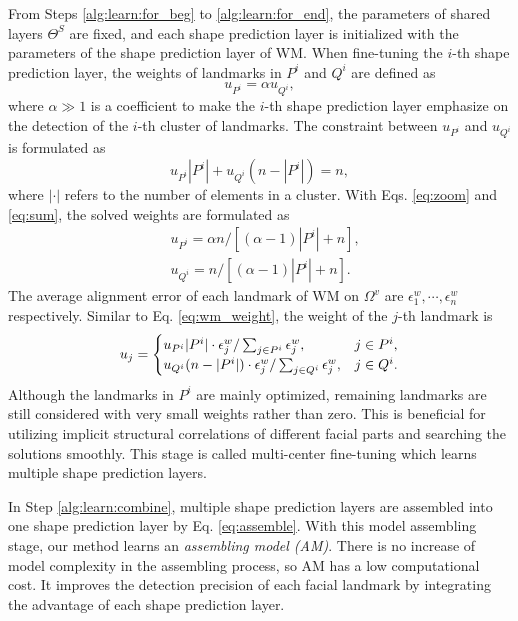 \documentclass[journal]{IEEEtran}
\begin{document}
From Steps \ref{alg:learn:for_beg} to \ref{alg:learn:for_end}, the parameters of shared layers $\Theta^{S}$ are fixed, and each shape prediction layer is initialized with the parameters of the shape prediction layer of WM. When fine-tuning the $i$-th shape prediction layer, the weights of landmarks in $P^{i}$ and $Q^{i}$ are defined as
\begin{equation}
\label{eq:zoom}
u_{P^{i}} = \alpha u_{Q^{i}},
\end{equation}
where $\alpha \gg 1$ is a coefficient to make the $i$-th shape prediction layer emphasize on the detection of the $i$-th cluster of landmarks. The constraint between $u_{P^{i}}$ and $u_{Q^{i}}$ is formulated as
\begin{equation}
\label{eq:sum}
u_{P^{i}} |P^{i}| + u_{Q^{i}} (n-|P^{i}|) = n,
\end{equation}
where $|\cdot|$ refers to the number of elements in a cluster. With Eqs. \ref{eq:zoom} and \ref{eq:sum}, the solved weights are formulated as
\begin{equation}
\begin{split}
&u_{P^{i}} = \alpha n/[(\alpha-1)|P^{i}|+n],\\
&u_{Q^{i}} = n/[(\alpha-1)|P^{i}|+n].
\end{split}
\end{equation}
The average alignment error of each landmark of WM on $\Omega^v$ are $\epsilon^w_1,\cdots, \epsilon^w_n$ respectively. Similar to Eq. \ref{eq:wm_weight}, the weight of the $j$-th landmark is
\begin{eqnarray}
\label{eq:landmark_am}
u_j=
\begin{cases}
u_{P^{i}} |P^{i}| \cdot \epsilon^w_j/\sum_{j\in P^{i}} \epsilon^w_j, &j\in P^{i},\cr u_{Q^{i}} (n-|P^{i}|) \cdot \epsilon^w_j/\sum_{j\in Q^{i}} \epsilon^w_j, &j\in Q^{i}.
\end{cases}
\end{eqnarray}
Although the landmarks in $P^{i}$ are mainly optimized, remaining landmarks are still considered with very small weights rather than zero. This is beneficial for utilizing implicit structural correlations of different facial parts and searching the solutions smoothly. This stage is called multi-center fine-tuning which learns multiple shape prediction layers.

In Step \ref{alg:learn:combine}, multiple shape prediction layers are assembled into one shape prediction layer by Eq. \ref{eq:assemble}. With this model assembling stage, our method learns an \emph{assembling model (AM)}. There is no increase of model complexity in the assembling process, so AM has a low computational cost. It improves the detection precision of each facial landmark by integrating the advantage of each shape prediction layer.
\end{document}
